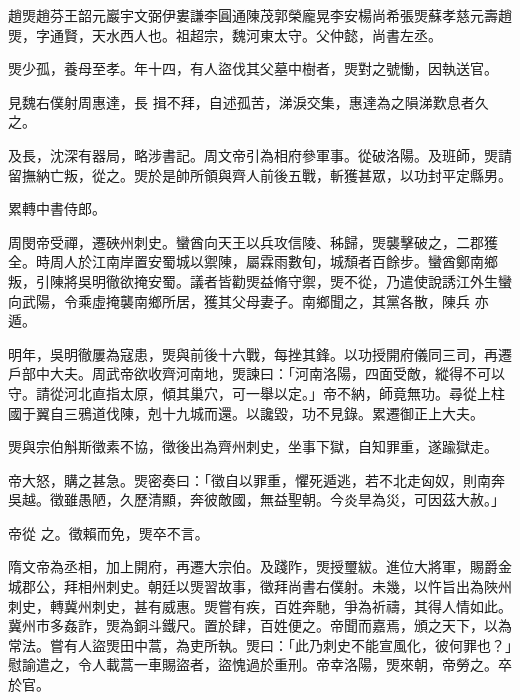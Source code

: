 
\begin{pinyinscope}

 趙煚趙芬王韶元巖宇文弼伊婁謙李圓通陳茂郭榮龐晃李安楊尚希張煚蘇孝慈元壽趙煚，字通賢，天水西人也。祖超宗，魏河東太守。父仲懿，尚書左丞。



 煚少孤，養母至孝。年十四，有人盜伐其父墓中樹者，煚對之號慟，因執送官。



 見魏右僕射周惠達，長
 揖不拜，自述孤苦，涕淚交集，惠達為之隕涕歎息者久之。



 及長，沈深有器局，略涉書記。周文帝引為相府參軍事。從破洛陽。及班師，煚請留撫納亡叛，從之。煚於是帥所領與齊人前後五戰，斬獲甚眾，以功封平定縣男。



 累轉中書侍郎。



 周閔帝受禪，遷硤州刺史。蠻酋向天王以兵攻信陵、秭歸，煚襲擊破之，二郡獲全。時周人於江南岸置安蜀城以禦陳，屬霖雨數旬，城頹者百餘步。蠻酋鄭南鄉叛，引陳將吳明徹欲掩安蜀。議者皆勸煚益脩守禦，煚不從，乃遣使說誘江外生蠻向武陽，令乘虛掩襲南鄉所居，獲其父母妻子。南鄉聞之，其黨各散，陳兵
 亦遁。



 明年，吳明徹屢為寇患，煚與前後十六戰，每挫其鋒。以功授開府儀同三司，再遷戶部中大夫。周武帝欲收齊河南地，煚諫曰：「河南洛陽，四面受敵，縱得不可以守。請從河北直指太原，傾其巢穴，可一舉以定。」帝不納，師竟無功。尋從上柱國于翼自三鴉道伐陳，剋十九城而還。以讒毀，功不見錄。累遷御正上大夫。



 煚與宗伯斛斯徵素不協，徵後出為齊州刺史，坐事下獄，自知罪重，遂踰獄走。



 帝大怒，購之甚急。煚密奏曰：「徵自以罪重，懼死遁逃，若不北走匈奴，則南奔吳越。徵雖愚陋，久歷清顯，奔彼敵國，無益聖朝。今炎旱為災，可因茲大赦。」



 帝從
 之。徵賴而免，煚卒不言。



 隋文帝為丞相，加上開府，再遷大宗伯。及踐阼，煚授璽紱。進位大將軍，賜爵金城郡公，拜相州刺史。朝廷以煚習故事，徵拜尚書右僕射。未幾，以忤旨出為陜州刺史，轉冀州刺史，甚有威惠。煚嘗有疾，百姓奔馳，爭為祈禱，其得人情如此。冀州市多姦詐，煚為銅斗鐵尺。置於肆，百姓便之。帝聞而嘉焉，頒之天下，以為常法。嘗有人盜煚田中蒿，為吏所執。煚曰：「此乃刺史不能宣風化，彼何罪也？」慰諭遣之，令人載蒿一車賜盜者，盜愧過於重刑。帝幸洛陽，煚來朝，帝勞之。卒於官。




\end{pinyinscope}
